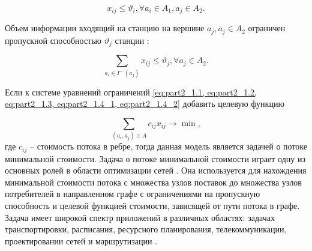 
\begin{equation}\label{eq:part2_1.4_1}
    x_{ij} \leqslant \vartheta_i, \forall a_i \in A_1, a_j \in A_2.
\end{equation}



Объем информации входящий на станцию на вершине $a_j, a_j \in A_2$ ограничен пропускной способностью $\vartheta_j$ станции : 


\begin{equation}\label{eq:part2_1.4_2}
    \sum_{a_i \in \Gamma^-(a_j)} x_{ij} \leqslant \vartheta_j, \forall a_j \in A_2.
\end{equation}


Если к системе уравнений ограничений \cref{eq:part2_1.1, eq:part2_1.2, eq:part2_1.3, eq:part2_1.4_1, eq:part2_1.4_2} добавить целевую функцию

\begin{equation}
    \label{eq:part2_1.5}
    \sum_{(a_i, a_j) \in A} c_{ij} x_{ij} \rightarrow \min ,
\end{equation}
где $c_{ij}$ -- стоимость потока в ребре, тогда данная модель является задачей о потоке минимальной стоимости. Задача о потоке минимальной стоимости играет одну из основных ролей в области оптимизации сетей \cite{Kovacs2015}. Она используется для нахождения минимальной стоимости потока с множества узлов поставок до множества узлов потребителей в направленном графе с ограничениями на пропускную способность и целевой функцией стоимости, зависящей от пути потока в графе. Задача имеет широкой спектр приложений в различных областях: задачах транспортировки, расписания, ресурсного планирования, телекоммуникации, проектировании сетей и маршрутизации \cite{Kovacs2015, Kiraly2012, Jiang2020}.  


